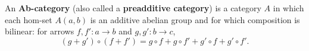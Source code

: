 An \textbf{Ab-category} (also called a \textbf{preadditive category}) is a category $A$ in which each hom-set $A(a, b)$ is an additive abelian group and for which composition is bilinear: for arrows $f, f': a \rightarrow b$ and $g, g': b \rightarrow c$,
\[
(g + g') \circ (f + f') = g \circ f + g \circ f' + g' \circ f + g' \circ f'.
\]